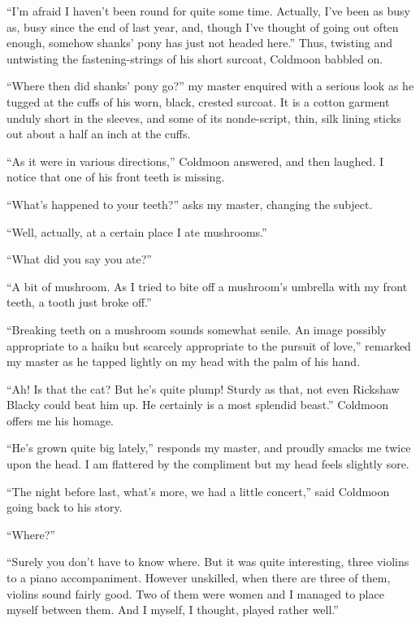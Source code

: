 \documentclass{book}
\begin{document}
``I'm afraid I haven't been round for quite some time. Actually, I've
been as busy as, busy since the end of last year, and, though I've
thought of going out often enough, somehow shanks' pony has just not
headed here.'' Thus, twisting and untwisting the fastening-strings of
his short surcoat, Coldmoon babbled on.

``Where then did shanks' pony go?'' my master enquired with a serious
look as he tugged at the cuffs of his worn, black, crested surcoat. It
is a cotton garment unduly short in the sleeves, and some of its
nonde-script, thin, silk lining sticks out about a half an inch at the
cuffs.

``As it were in various directions,'' Coldmoon answered, and then
laughed. I notice that one of his front teeth is missing.

``What's happened to your teeth?'' asks my master, changing the subject.

``Well, actually, at a certain place I ate mushrooms.''

``What did you say you ate?''

``A bit of mushroom. As I tried to bite off a mushroom's umbrella with
my front teeth, a tooth just broke off.''

``Breaking teeth on a mushroom sounds somewhat senile. An image possibly
appropriate to a haiku but scarcely appropriate to the pursuit of
love,'' remarked my master as he tapped lightly on my head with the palm
of his hand.

``Ah! Is that the cat? But he's quite plump! Sturdy as that, not even
Rickshaw Blacky could beat him up. He certainly is a most splendid
beast.'' Coldmoon offers me his homage.

``He's grown quite big lately,'' responds my master, and proudly smacks
me twice upon the head. I am flattered by the compliment but my head
feels slightly sore.

``The night before last, what's more, we had a little concert,'' said
Coldmoon going back to his story.

``Where?''

``Surely you don't have to know where. But it was quite interesting,
three violins to a piano accompaniment. However unskilled, when there
are three of them, violins sound fairly good. Two of them were women and
I managed to place myself between them. And I myself, I thought, played
rather well.''
\end{document}
